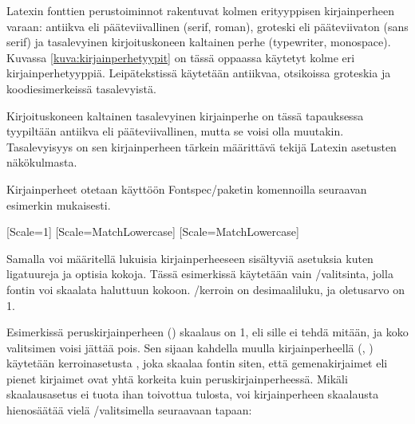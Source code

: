 Latexin fonttien perus\-toiminnot rakentuvat kolmen erityyppisen
kirjainperheen varaan: antiikva eli pääteviivallinen
(\textenglish{serif, roman}), groteski eli pääteviivaton
(\textenglish{sans serif}) ja tasalevyinen kirjoituskoneen kaltainen
perhe (\textenglish{typewriter, monospace}). Kuvassa
\ref{kuva:kirjainperhetyypit} on tässä oppaassa käytetyt kolme eri
kirjainperhetyyppiä. Leipätekstissä käytetään antiikvaa, otsikoissa
groteskia ja koodi\-esi\-mer\-keis\-sä tasalevyistä.


Kirjoituskoneen kaltainen tasalevyinen kirjainperhe on tässä tapauksessa
tyypiltään antiikva eli pääteviivallinen, mutta se voisi olla muutakin.
Tasalevyisyys on sen kirjainperheen tärkein määrittävä tekijä Latexin
asetusten näkökulmasta.


Kirjainperheet otetaan käyttöön Fontspec\-/paketin komennoilla seuraavan
esimerkin mukaisesti.

\begin{koodilohkosis}
  \usepackage{fontspec}
  \setmainfont{TeX Gyre Termes}[Scale=1]
  \setsansfont{TeX Gyre Heros} [Scale=MatchLowercase]
  \setmonofont{TeX Gyre Cursor}[Scale=MatchLowercase]
\end{koodilohkosis}

Samalla voi määritellä lukuisia kirjainperheeseen sisältyviä asetuksia
kuten ligatuureja ja optisia kokoja. Tässä esimerkissä käytetään vain
\-/valitsinta, jolla fontin voi skaalata haluttuun kokoon.
\-/kerroin on desimaaliluku, ja oletus\-arvo on 1.

Esimerkissä peruskirjainperheen () skaalaus on
1, eli sille ei tehdä mitään, ja koko valitsimen voisi jättää pois. Sen
sijaan kahdella muulla kirjainperheellä (,
) käytetään ker\-roin\-ase\-tus\-ta
, joka skaalaa fontin siten, että gemenakirjaimet
eli pienet kirjaimet ovat yhtä korkeita kuin peruskirjainperheessä.
Mikäli skaa\-laus\-ase\-tus  ei tuota ihan
toivottua tulosta, voi kirjainperheen skaalausta hienosäätää vielä
\-/valitsimella seuraavaan tapaan:

